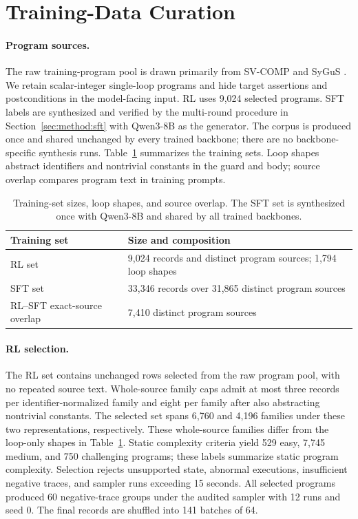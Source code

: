 \section{Training-Data Curation}
\label{app:data-curation}

\paragraph{Program sources.}
The raw training-program pool is drawn primarily from SV-COMP and SyGuS
\citep{svcomp,alur2013sygus}.  We retain scalar-integer single-loop programs
and hide target assertions and postconditions in the model-facing input.
RL uses 9,024 selected programs. SFT labels are synthesized and verified
by the multi-round procedure in Section~\ref{sec:method:sft} with Qwen3-8B
as the generator.  The corpus is produced once and shared unchanged by every
trained backbone; there are no backbone-specific synthesis runs.
Table~\ref{tab:training-sets} summarizes the training sets. Loop shapes
abstract identifiers and nontrivial constants in the guard and body;
source overlap compares program text in training prompts.

\begin{table}[H]
\centering
\begin{tabular}{lp{7.2cm}}
\toprule
\rowcolor{algobg}
Training set & Size and composition \\
\midrule
RL set & 9,024 records and distinct program sources; 1,794 loop shapes \\
SFT set & 33,346 records over 31,865 distinct program sources \\
RL--SFT exact-source overlap & 7,410 distinct program sources \\
\bottomrule
\end{tabular}
\caption{Training-set sizes, loop shapes, and source overlap.  The SFT set
is synthesized once with Qwen3-8B and shared by all trained backbones.}
\label{tab:training-sets}
\end{table}

\paragraph{RL selection.}
The RL set contains unchanged rows selected from the raw program pool, with
no repeated source text.  Whole-source family caps admit at most three
records per identifier-normalized family and eight per family after also
abstracting nontrivial constants.  The selected set spans 6,760 and 4,196
families under these two representations, respectively.  These whole-source
families differ from the loop-only shapes in Table~\ref{tab:training-sets}.
Static complexity criteria yield 529 easy, 7,745 medium, and 750 challenging
programs; these labels summarize static program complexity. Selection rejects unsupported state, abnormal executions,
insufficient negative traces, and sampler runs exceeding 15 seconds.  All
selected programs produced 60 negative-trace groups under the audited sampler
with 12 runs and seed 0. The final records are shuffled into 141 batches of 64.

